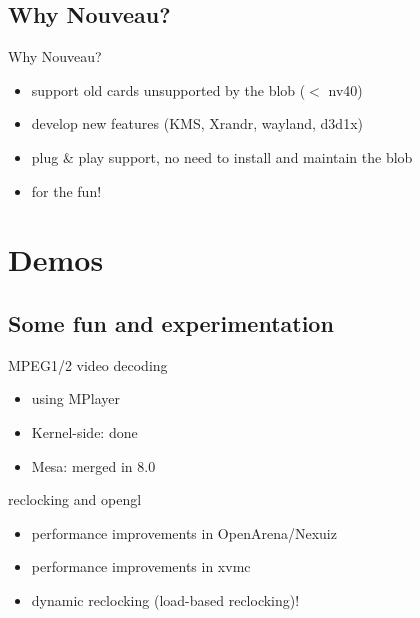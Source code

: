 \documentclass[11pt,english,compress]{beamer}
\begin{document}
	\subsection*{Why Nouveau?}
		\begin{frame}
			\begin{block}{Why Nouveau?}
				\begin{itemize}
					\item support old cards unsupported by the blob ($<$ nv40)
					\item develop new features (KMS, Xrandr, wayland, d3d1x)
					\item plug \& play support, no need to install and maintain the blob
					\item for the fun!
				\end{itemize}
			\end{block}
		\end{frame}

\section{Demos}
	\subsection*{Some fun and experimentation}
		\begin{frame}
			\begin{block}{MPEG1/2 video decoding}
				\begin{itemize}
					\item using MPlayer
					\item Kernel-side: done
					\item Mesa: merged in 8.0
				\end{itemize}
			\end{block}

			\begin{block}{reclocking and opengl}
				\begin{itemize}
					\item performance improvements in OpenArena/Nexuiz
					\item performance improvements in xvmc
					\item dynamic reclocking (load-based reclocking)!
				\end{itemize}
			\end{block}
		\end{frame}
\end{document}
